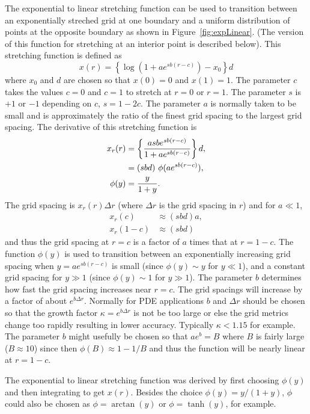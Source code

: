 The exponential to linear stretching function can be used to transition between
an exponentially streched grid at one boundary and a uniform distribution of
points at the opposite boundary as shown in Figure~\ref{fig:expLinear}. (The version of this
function for stretching at an interior point is described below).
This stretching function is defined as 
\begin{equation}
  x(r) = \left\{ \log( 1 + a e^{s b (r-c)} )  - x_0 \right\} d 
\end{equation}
where $x_0$ and $d$ are chosen so that $x(0)=0$ and $x(1)=1$. The parameter $c$
takes the values $c=0$ and $c=1$ to stretch at $r=0$ or $r=1$. The parameter $s$ is $+1$ or $-1$ depending on $c$, $s=1-2c$.
The parameter $a$ is normally taken to be small and is approximately the ratio of the finest
grid spacing to the largest grid spacing. 
The derivative of this stretching function is 
\begin{align*}
  x_r(r) & = \left\{ { a s b e^{s b (r-c)} \over  1 + a e^{s b (r-c)}} \right\} d,  \\
         & = (s b d)~ \phi(a e^{s b (r-c)}),     \\
  \phi(y) & = { y \over 1 + y } .
\end{align*}
The grid spacing is $x_r(r) \Delta r$ (where $\Delta r$ is the grid spacing in $r$) and for $a \ll 1 $,
\begin{align*}
  x_r(c) & \approx  (s b d) a  , \\
  x_r(1-c) & \approx (sb d)
\end{align*}
and thus the grid spacing at $r=c$ is a factor of $a$ times that at $r=1-c$.
The function $\phi(y)$ is used to transition between an exponentially increasing
grid spacing when $y=a e^{s b (r-c)}$ is small (since $\phi(y) \sim y$ for $y\ll 1$),
and a constant grid spacing for $y\gg 1$ (since $\phi(y) \sim 1$ for $y\gg 1$).
The parameter $b$ determines how fast the grid spacing increases near $r=c$. The grid spacings
will increase by a factor of about $e^{b \Delta r}$. Normally for PDE applications $b$ and $\Delta r$ should be
chosen so that the growth factor $\kappa = e^{b \Delta r}$
is not be too large or else the grid metrics change too rapidly resulting in lower accuracy. 
Typically $\kappa < 1.15$ for example. 
The parameter $b$ might usefully be chosen so that
$a e^b = B$ where $B$ is fairly large ($B\approx 10$) since then $\phi(B) \approx 1 - 1/B $ and thus
the function will be nearly linear at $r=1-c$. 

The exponential to linear stretching function was derived by first choosing $\phi(y)$
and then integrating to get $x(r)$. Besides the choice $\phi(y)=y/(1+y)$, 
$\phi$ could also be chosen as $\phi = \arctan(y)$ or $\phi=\tanh(y)$, for example.

